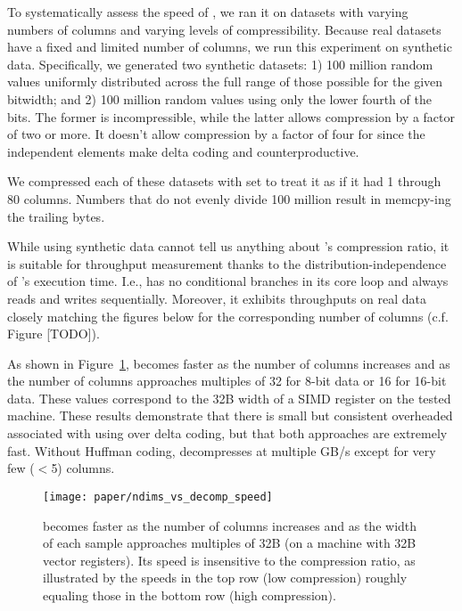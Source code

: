 To systematically assess the speed of \minesp, we ran it on datasets with varying numbers of columns and varying levels of compressibility. Because real datasets have a fixed and limited number of columns, we run this experiment on synthetic data. Specifically, we generated two synthetic datasets: 1) 100 million random values uniformly distributed across the full range of those possible for the given bitwidth; and 2) 100 million random values using only the lower fourth of the bits. The former is incompressible, while the latter allows compression by a factor of two or more. It doesn't allow compression by a factor of four for \minesp since the independent elements make delta coding and \fire counterproductive.

We compressed each of these datasets with \minesp set to treat it as if it had 1 through 80 columns. Numbers that do not evenly divide 100 million result in \minesp memcpy-ing the trailing bytes.

While using synthetic data cannot tell us anything about \mine's compression ratio, it is suitable for throughput measurement thanks to the distribution-independence of \mine's execution time. I.e., \minesp has no conditional branches in its core loop and always reads and writes sequentially. Moreover, it exhibits throughputs on real data closely matching the figures below for the corresponding number of columns (c.f. Figure [TODO]).

As shown in Figure~\ref{fig:ndims_vs_decomp_speed}, \minesp becomes faster as the number of columns increases and as the number of columns approaches multiples of 32 for 8-bit data or 16 for 16-bit data. These values correspond to the 32B width of a SIMD register on the tested machine. These results demonstrate that there is small but consistent overheaded associated with using \fire over delta coding, but that both approaches are extremely fast. Without Huffman coding, \mine decompresses at multiple GB/s except for very few ($<$5) columns.

\begin{figure}[h]
\begin{center}
    \texttt{[image: paper/ndims\_vs\_decomp\_speed]}
    \caption{\minesp becomes faster as the number of columns increases and as the width of each sample approaches multiples of 32B (on a machine with 32B vector registers). Its speed is insensitive to the compression ratio, as illustrated by the speeds in the top row (low compression) roughly equaling those in the bottom row (high compression).}
    \label{fig:ndims_vs_decomp_speed}
\end{center}
\end{figure}


